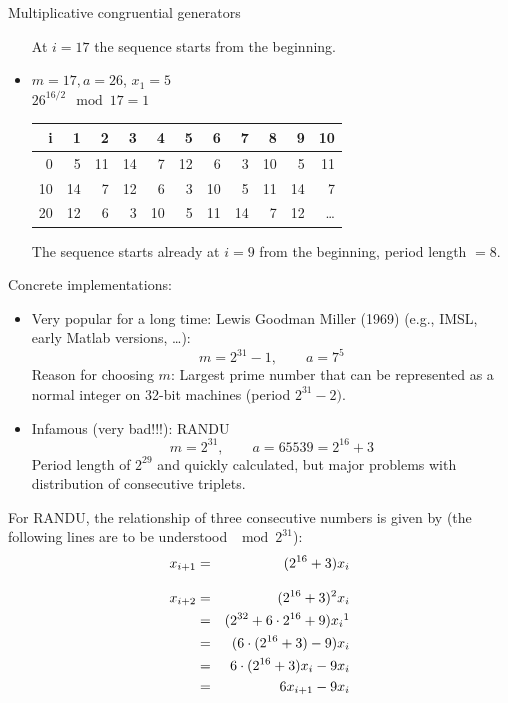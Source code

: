 \begin{vbframe}{Multiplicative congruential generators}
\begin{itemize}
At $i=17$ the sequence starts from the beginning.


\item  $m=17, a=26$, $x_1 = 5$ \\
$26^{16/2} \mod 17 = 1$

\begin{table}
\begin{footnotesize}
\centering
\begin{tabular}{r|rrrrrrrrrr}
  \hline
i & 1 & 2 & 3 & 4 & 5 & 6 & 7 & 8 & 9 & 10 \\
  \hline
0 & \cellcolor{orange}5 & 11 & 14 & 7 & 12 & 6 & 3 & 10 & \cellcolor{orange}5 & 11 \\
  10 & 14 & 7 & 12 & 6 & 3 & 10 & \cellcolor{orange}5 & 11 & 14 & 7 \\
  20 & 12 & 6 & 3 & 10 & \cellcolor{orange}5 & 11 & 14 & 7 & 12 &  \ldots \\
   \hline
\end{tabular}
\end{footnotesize}
\end{table}

The sequence starts already at $i = 9$ from the beginning, period length $=8$.

\end{itemize}

\framebreak

Concrete implementations:
\begin{itemize}
 \item Very popular for a long time: Lewis Goodman Miller (1969) (e.g., IMSL, early Matlab versions, \ldots):
    $$
      m=2^{31}-1, \qquad a=7^5
    $$
    Reason for choosing $m$: Largest prime number that can be represented as a normal integer on 32-bit machines (period $2^{31} - 2)$.
 \item Infamous (very bad!!!): RANDU
    $$
    m=2^{31}, \qquad a = 65539 = 2^{16}+3
    $$
    Period length of $2^{29}$ and quickly calculated, but major problems with distribution of
    consecutive triplets.
\end{itemize}

\framebreak

For RANDU, the relationship of three consecutive numbers is given by (the following lines are to be understood $\mod 2^{31}$):
\begin{eqnarray*}
x_{i + 1} &=& (2^{16} + 3) x_i \\[0.3cm]
x_{i + 2} &=& (2^{16} + 3)^2 x_i \\
          &=& (2^{32} + 6 \cdot 2^{16} + 9) x_i \footnotemark \\
          &=& (6 \cdot (2^{16} + 3) - 9) x_i \\
          &=& 6 \cdot (2^{16} + 3) x_i - 9 x_i \\
          &=& 6 x_{i + 1} - 9 x_i
\end{eqnarray*}


\end{vbframe}
